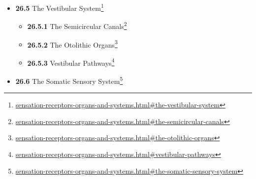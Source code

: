 \documentclass[
]{article}
\providecommand{\tightlist}{%
  \setlength{\itemsep}{0pt}\setlength{\parskip}{0pt}}
\providecommand{\tightlist}{%
  \setlength{\itemsep}{0pt}\setlength{\parskip}{0pt}}
\let\rmarkdownfootnote\footnote%
\def\footnote{\protect\rmarkdownfootnote}
\renewcommand{\href}[2]{#2\footnote{\url{#1}}}
\theoremstyle{definition}
\theoremstyle{definition}
\theoremstyle{definition}
\theoremstyle{remark}
\begin{document}
\begin{itemize}
\begin{itemize}
    \begin{itemize}
    \tightlist
    \item
      \href{sensation-receptors-organs-and-systems.html\#organ-of-corti}{\emph{}\textbf{26.4.1}
      Organ Of Corti}
    \item
      \href{sensation-receptors-organs-and-systems.html\#auditory-transduction}{\emph{}\textbf{26.4.2}
      Auditory Transduction}
    \item
      \href{sensation-receptors-organs-and-systems.html\#auditory-pathways}{\emph{}\textbf{26.4.3}
      Auditory Pathways}
    \item
      \href{sensation-receptors-organs-and-systems.html\#the-cochlear-nucleus}{\emph{}\textbf{26.4.4}
      The Cochlear Nucleus}
    \item
      \href{sensation-receptors-organs-and-systems.html\#the-trapezoid-body}{\emph{}\textbf{26.4.5}
      The Trapezoid Body}
    \item
      \href{sensation-receptors-organs-and-systems.html\#the-superior-olivary-complex}{\emph{}\textbf{26.4.6}
      The superior olivary complex}
    \item
      \href{sensation-receptors-organs-and-systems.html\#the-lateral-lemniscus}{\emph{}\textbf{26.4.7}
      The Lateral Lemniscus}
    \item
      \href{sensation-receptors-organs-and-systems.html\#the-inferior-colliculi}{\emph{}\textbf{26.4.8}
      The Inferior Colliculi}
    \item
      \href{sensation-receptors-organs-and-systems.html\#the-medial-geniculate-nucleus-mgn}{\emph{}\textbf{26.4.9}
      The Medial Geniculate Nucleus (MGN)}
    \item
      \href{sensation-receptors-organs-and-systems.html\#the-primary-auditory-cortex}{\emph{}\textbf{26.4.10}
      The Primary Auditory Cortex}
    \item
      \href{sensation-receptors-organs-and-systems.html\#the-auditory-ventral-and-dorsal-streams}{\emph{}\textbf{26.4.11}
      The Auditory Ventral And Dorsal Streams}
    \end{itemize}
  \item
    \href{sensation-receptors-organs-and-systems.html\#the-vestibular-system}{\emph{}\textbf{26.5}
    The Vestibular System}

    \begin{itemize}
    \tightlist
    \item
      \href{sensation-receptors-organs-and-systems.html\#the-semicircular-canals}{\emph{}\textbf{26.5.1}
      The Semicircular Canals}
    \item
      \href{sensation-receptors-organs-and-systems.html\#the-otolithic-organs}{\emph{}\textbf{26.5.2}
      The Otolithic Organs}
    \item
      \href{sensation-receptors-organs-and-systems.html\#vestibular-pathways}{\emph{}\textbf{26.5.3}
      Vestibular Pathways}
    \end{itemize}
  \item
    \href{sensation-receptors-organs-and-systems.html\#the-somatic-sensory-system}{\emph{}\textbf{26.6}
    The Somatic Sensory System}


\end{itemize}
\end{itemize}
\end{document}
